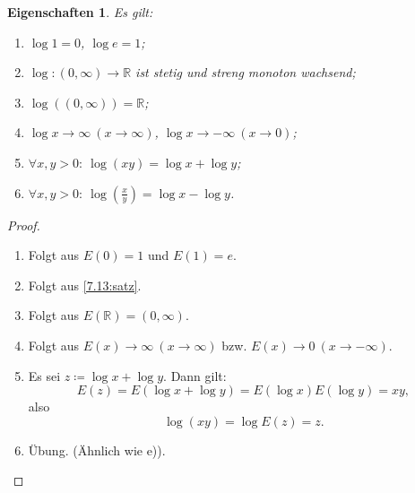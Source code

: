\documentclass[12pt]{extreport} %
\newcommand{\R}{\mathbb{R}}
\theoremstyle{named}
\theoremstyle{itshape}
\theoremstyle{normal}
\newtheorem*{eigenschaften}{Eigenschaften}
\begin{document}
\begin{eigenschaften} Es gilt:
	\begin{enumerate}
		\item $\log 1 = 0$, $\log e = 1$;
		\item $\log \colon (0, \infty) \rightarrow \R$ ist stetig und streng monoton wachsend;
		\item $\log \left( (0, \infty) \right) = \R$;
		\item $\log x \rightarrow \infty ~(x \rightarrow \infty)$, $\log x \rightarrow -\infty ~(x \rightarrow 0)$;
		\item $\forall x, y > 0: ~ \log(xy) = \log x + \log y$;
		\item $\forall x, y > 0: ~ \log\left(\frac{x}{y}\right) = \log x - \log y$.
	\end{enumerate}	
\end{eigenschaften}

\begin{proof} ~\
	\begin{enumerate}
		\item Folgt aus $E(0)=1$ und $E(1)=e$.
		\item Folgt aus \ref{7.13:satz}.
		\item Folgt aus $E(\R) = (0, \infty)$.
		\item Folgt aus $E(x) \rightarrow \infty ~(x \rightarrow \infty)$ bzw. $E(x) \rightarrow 0 ~(x \rightarrow -\infty)$.
		\item Es sei $z \coloneqq \log x + \log y$. Dann gilt: 
		$$E(z) =E(\log x + \log y) = E(\log x) E(\log y) = x y,$$ also 
		$$\log(xy) = \log E(z) = z.$$ 
		\item Übung. (Ähnlich wie e)).
	\end{enumerate}
\end{proof}
\end{document}
